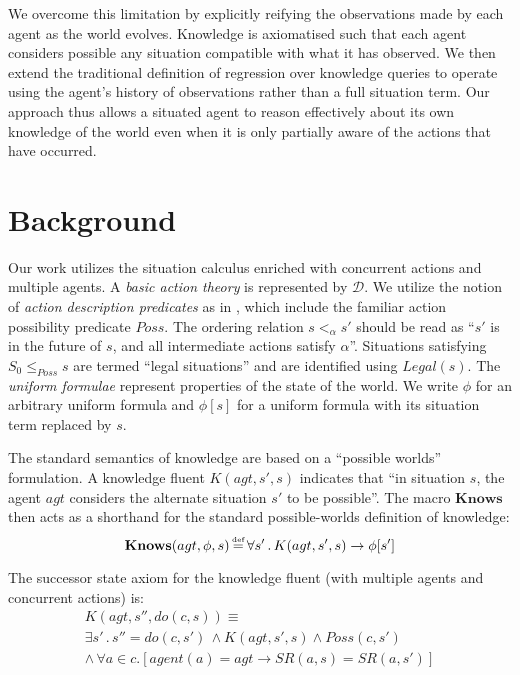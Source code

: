\documentclass{ifaamas-submission}
\newcommand{\isdef}{\hbox{$\stackrel{\mbox{\tiny def}}{=}$}}
\begin{document}
We overcome this limitation by explicitly reifying the observations made by
each agent as the world evolves. Knowledge is axiomatised such that each agent
considers possible any situation compatible with what it has observed.
We then extend the traditional definition of regression
over knowledge queries to operate using the agent's history of
observations rather than a full situation term.  Our approach thus
allows a situated agent to reason effectively about its own knowledge of
the world even when
it is only partially aware of the actions that have occurred.

\section{Background}

Our work utilizes the situation calculus \cite{pirri99contributions_sitcalc} 
enriched with concurrent actions \cite{scherl03conc_knowledge} and multiple
agents. A \emph{basic action theory} is represented by $\mathcal{D}$.
We utilize the notion of \emph{action description predicates} as in
\cite{kelly07sc_persistence}, which include the familiar action possibility
predicate $Poss$.
The ordering relation $s <_{\alpha} s'$ should be read as {}``$s'$ is in
the future of $s$, and all intermediate actions satisfy $\alpha$''.
Situations satisfying $S_0 \leq_{Poss} s$ are termed {}``legal situations''
and are identified using $Legal(s)$.
The \emph{uniform formulae} \cite{pirri99contributions_sitcalc}
 represent properties of the state of the world.
We write $\phi$ for an arbitrary uniform
formula and $\phi[s]$ for a uniform formula with its situation
term replaced by $s$.

The standard semantics of knowledge 
\cite{scherl03sc_knowledge,scherl03conc_knowledge} are
based on a {}``possible worlds'' formulation. A knowledge fluent
$K(agt,s',s)$ indicates that {}``in situation $s$, the
agent $agt$ considers the alternate situation $s'$ to be possible''.
The macro $\mathbf{Knows}$ then acts as a shorthand for
the standard possible-worlds definition of knowledge:
\begin{equation*}
\mathbf{Knows}(agt,\phi,s)\,\isdef\,\forall s'\,.\, K(agt,s',s)\rightarrow\phi[s']\label{eqn:knows_def}
\end{equation*}

The successor state axiom for the knowledge fluent (with
multiple agents and concurrent actions) is:
\begin{multline*}
K(agt,s'',do(c,s))\equiv\\
\exists s'\,.\, s''=do(c,s')\,\wedge K(agt,s',s)\wedge Poss(c,s')\\
\wedge\,\forall a\in c.\left[agent(a)=agt\rightarrow SR(a,s)=SR(a,s')\right]\label{eqn:k_ssa_standard}
\end{multline*}
 
\end{document}
